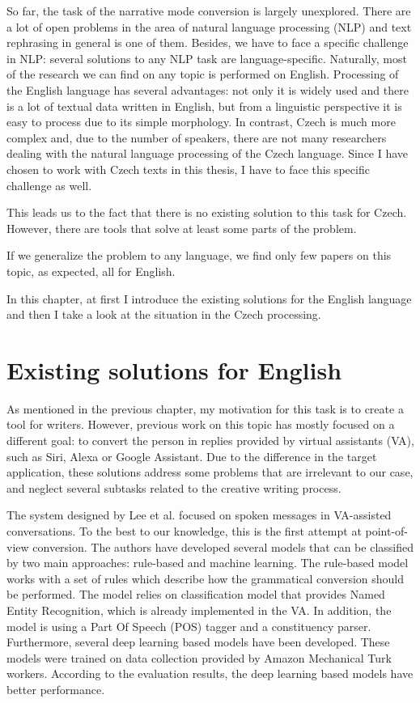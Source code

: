 So far, the task of the narrative mode conversion is largely unexplored. There are a lot of open problems in the area of natural language processing (NLP) and text rephrasing in general is one of them. Besides, we have to face a specific challenge in NLP: several solutions to any NLP task are language-specific. Naturally, most of the research we can find on any topic is performed on English. Processing of the English language has several advantages: not only it is widely used and there is a lot of textual data written in English, but from a linguistic perspective it is easy to process due to its simple morphology. In contrast, Czech is much more complex and, due to the number of speakers, there are not many researchers dealing with the natural language processing of the Czech language. Since I have chosen to work with Czech texts in this thesis, I have to face this specific challenge as well.

This leads us to the fact that there is no existing solution to this task for Czech. However, there are tools that solve at least some parts of the problem.

If we generalize the problem to any language, we find only few papers on this topic, as expected, all for English.

In this chapter, at first I introduce the existing solutions for the English language and then I take a look at the situation in the Czech processing.

\section{Existing solutions for English}

As mentioned in the previous chapter, my motivation for this task is to create a tool for writers. However, previous work on this topic has mostly focused on a different goal: to convert the person in replies provided by virtual assistants (VA), such as Siri, Alexa or Google Assistant.  Due to the difference in the target application, these solutions address some problems that are irrelevant to our case, and neglect several subtasks related to the creative writing process.

The system designed by Lee et al. \cite{lee2020converting} focused on spoken messages in VA-assisted conversations. To the best to our knowledge, this is the first attempt at point-of-view conversion. The authors have developed several models that can be classified by two main approaches: rule-based and machine learning. The rule-based model works with a set of rules which describe how the grammatical conversion should be performed. The model relies on classification model that provides Named Entity Recognition, which is already implemented in the VA. In addition, the model is using a Part Of Speech (POS) tagger and a constituency parser. Furthermore, several deep learning based models have been developed. These models were trained on data collection provided by Amazon Mechanical Turk workers. According to the evaluation results, the deep learning based models have better performance.

